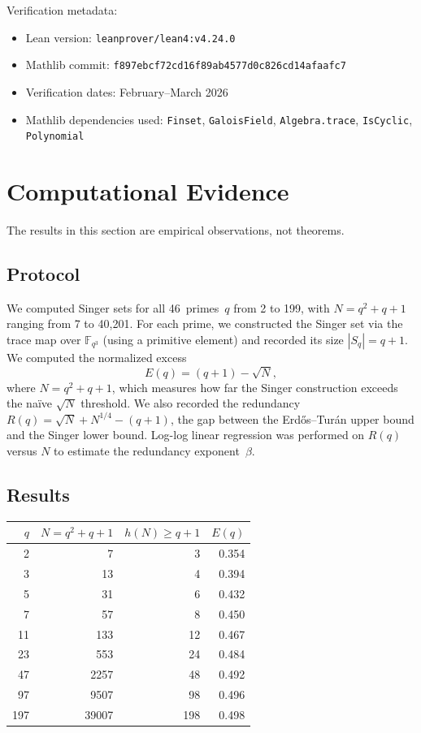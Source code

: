 \documentclass[11pt]{amsart}
\theoremstyle{plain}
\theoremstyle{definition}
\theoremstyle{remark}
\begin{document}
Verification metadata:
\begin{itemize}
\item Lean version: \texttt{leanprover/lean4:v4.24.0}
\item Mathlib commit: \texttt{f897ebcf72cd16f89ab4577d0c826cd14afaafc7}
\item Verification dates: February--March 2026
\item Mathlib dependencies used: \texttt{Finset}, \texttt{GaloisField},
  \texttt{Algebra.trace}, \texttt{IsCyclic}, \texttt{Polynomial}
\end{itemize}

\section{Computational Evidence}\label{sec:computation}

The results in this section are empirical observations, not theorems.

\subsection{Protocol}

We computed Singer sets for all 46~primes~$q$ from 2 to 199, with
$N = q^2 + q + 1$ ranging from 7 to 40{,}201.
For each prime, we constructed the Singer set via the trace map over
$\mathbb{F}_{q^3}$ (using a primitive element) and recorded its size
$|S_q| = q + 1$.
We computed the normalized excess
\[
  E(q) = (q+1) - \sqrt{N},
\]
where $N = q^2+q+1$, which measures how far the Singer construction
exceeds the na\"{i}ve $\sqrt{N}$ threshold.
We also recorded the redundancy
$R(q) = \sqrt{N} + N^{1/4} - (q+1)$, the gap between the
Erd\H{o}s--Tur\'an upper bound and the Singer lower bound.
Log-log linear regression was performed on $R(q)$ versus $N$ to
estimate the redundancy exponent~$\beta$.

\subsection{Results}

\begin{center}
\begin{tabular}{rrrr}
\toprule
$q$ & $N = q^2+q+1$ & $h(N) \ge q+1$ & $E(q)$ \\
\midrule
2   & 7       & 3    & 0.354 \\
3   & 13      & 4    & 0.394 \\
5   & 31      & 6    & 0.432 \\
7   & 57      & 8    & 0.450 \\
11  & 133     & 12   & 0.467 \\
23  & 553     & 24   & 0.484 \\
47  & 2257    & 48   & 0.492 \\
97  & 9507    & 98   & 0.496 \\
197 & 39007   & 198  & 0.498 \\
\bottomrule
\end{tabular}
\end{center}
\end{document}
